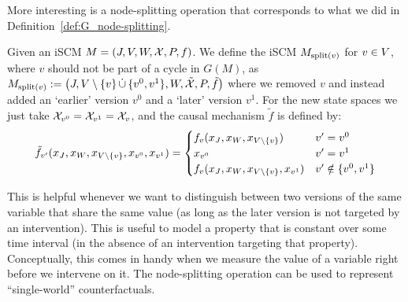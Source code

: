 {More interesting is a node-splitting operation that corresponds to what we did in Definition~\ref{def:G_node-splitting}.
\begin{Def}
Given an iSCM $M = \left ( J, V, W, \mathcal{X}, P, f \right )$.
We define the iSCM $M_{\mathrm{split}(v)}$ for $v \in V$, where $v$ should not be part of a cycle in $G(M)$, as
  $M_{\mathrm{split}(v)} := \left ( J, V \setminus \{v\} \,\dot{\cup}\, \{v^0,v^1\}, W, \tilde{\mathcal{X}}, P, \tilde{f} \right )$
where we removed $v$ and instead added an `earlier' version $v^0$ and a `later' version $v^1$.
For the new state spaces we just take $\mathcal{X}_{v^0} = \mathcal{X}_{v^1} = \mathcal{X}_v$, and the causal mechanism $\tilde{f}$ is defined by:
  $$\tilde{f}_{v'}(x_J,x_W,x_{V\setminus \{v\}},x_{v^0},x_{v^1}) = \begin{cases}
    f_v(x_J,x_W,x_{V\setminus \{v\}}) & v' = v^0 \\
    x_{v^0} & v' = v^1 \\
    f_v(x_J,x_W,x_{V\setminus \{v\}},x_{v^1}) & v' \notin \{v^0,v^1\}
  \end{cases}$$
\end{Def}
This is helpful whenever we want to distinguish between two versions of the same variable that share the same value (as long as the later version is not targeted by an intervention).
This is useful to model a property that is constant over some time interval (in the absence of an intervention targeting that property).
Conceptually, this comes in handy when we measure the value of a variable right before we intervene on it.
The node-splitting operation can be used to represent ``single-world'' counterfactuals.

}
